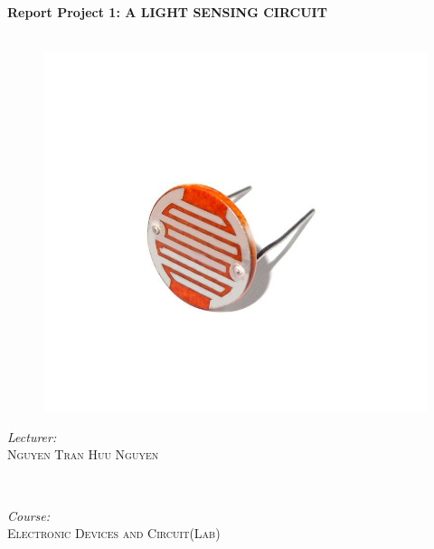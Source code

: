 \documentclass[11pt]{article}
\begin{document}
\begin{titlepage}
\begin{figure}[ht]
		
	\end{figure}
	
	\HRule\\[0.4cm]
	
	{\huge\bfseries Report Project 1: A LIGHT SENSING CIRCUIT}\\[0.4cm] %
	
	\HRule\\[0.5cm]
	\begin{figure}[ht]
		\begin{center}
			
			\includegraphics[scale=0.2]{sensor.jpg}\\
			
		\end{center}
	\end{figure}
	
	\begin{minipage}{0.5\textwidth}
		\begin{flushleft}
			\large
			\textit{Lecturer: }\\
			 \textsc{Nguyen Tran Huu Nguyen} %
		\end{flushleft}
	\end{minipage}
	~
	\begin{minipage}{0.4\textwidth}
		\begin{flushright}
			\large
			\textit{Course:}\\
			 \textsc{Electronic Devices and Circuit(Lab)} %
		\end{flushright}
	\end{minipage}
	

\end{titlepage}
\end{document}
